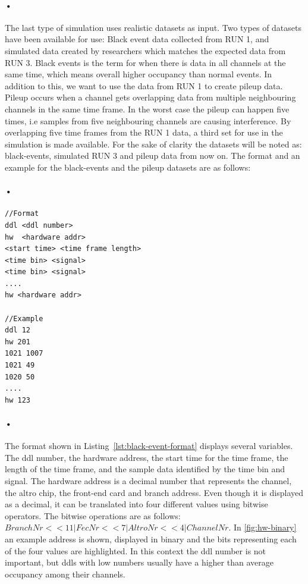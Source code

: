 \documentclass[a4paper, 12pt]{report}
\begin{document}
\paragraph{•}
The last type of simulation uses realistic datasets as input. 
Two types of datasets have been available for use: Black event data collected from RUN 1, and simulated data created by researchers which matches the expected data from RUN 3.
Black events is the term for when there is data in all channels at the same time, which means overall higher occupancy than normal events.
In addition to this, we want to use the data from RUN 1 to create pileup data.
Pileup occurs when a channel gets overlapping data from multiple neighbouring channels in the same time frame.
In the worst case the pileup can happen five times, i.e samples from five neighbouring channels are causing interference.
By overlapping five time frames from the RUN 1 data, a third set for use in the simulation is made available.
For the sake of clarity the datasets will be noted as: black-events, simulated RUN 3 and pileup data from now on.
The format and an example for the black-events and the pileup datasets are as follows:

\paragraph{•}
\begin{minipage}{\linewidth}
\begin{lstlisting}[caption=Format for the black-event and pileup dataset., label=lst:black-event-format]
//Format
ddl <ddl number>
hw  <hardware addr>
<start time> <time frame length>
<time bin> <signal>
<time bin> <signal>
....
hw <hardware addr>

//Example
ddl 12
hw 201
1021 1007
1021 49
1020 50
....
hw 123
\end{lstlisting}
\end{minipage}

\paragraph{•}
The format shown in Listing~\ref{lst:black-event-format} displays several variables.
The ddl number, the hardware address, the start time for the time frame, the length of the time frame, and the sample data identified by the time bin and signal.
The hardware address is a decimal number that represents the channel, the \gls{altro} chip, the front-end card and branch address.
Even though it is displayed as a decimal, it can be translated into four different values using bitwise operators.
The bitwise operations are as follows: $BranchNr << 11 | FecNr << 7 | AltroNr << 4 | ChannelNr $.
In \ref{fig:hw-binary} an example address is shown, displayed in binary and the bits representing each of the four values are highlighted.
In this context the ddl number is not important, but ddls with low numbers usually have a higher than average occupancy among their channels.
\end{document}
